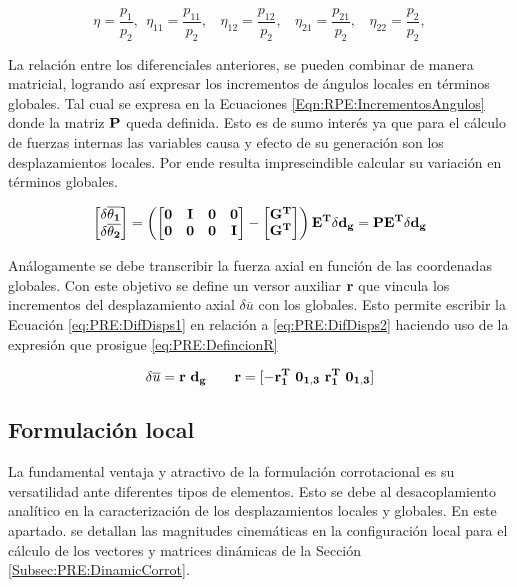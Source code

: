 \begin{equation}\label{Eqn:RPE:VectoresP}
	\eta = \frac{p_1}{p_2}, ~~\eta_{11} = \frac{p_{11}}{p_2}, ~~~~\eta_{12} = \frac{p_{12}}{p_2}, ~~~~\eta_{21} = \frac{p_{21}}{p_2}, ~~~~\eta_{22} = \frac{p_{2}}{p_2}, 
\end{equation}


La relación entre los diferenciales anteriores, se pueden combinar de manera matricial, logrando así expresar los incrementos de ángulos locales en términos globales. Tal cual se expresa en la Ecuaciones \eqref{Eqn:RPE:IncrementosAngulos} donde la matriz $\bf{P}$ queda definida. Esto es de sumo interés ya que para el cálculo de fuerzas internas las variables causa y efecto de su generación son los desplazamientos locales. Por ende resulta imprescindible calcular su variación en términos globales. 


\begin{equation}\label{Eqn:RPE:IncrementosAngulos}
	\begin{bmatrix}
		\bf{\delta\overline{\theta_1}}\\ 
		\bf{\delta\overline{\theta_2}}
	\end{bmatrix}=\left ( \begin{bmatrix}
		\bf{0} &\bf{I}  & \bf{0} &\bf{0} \\ 
		\bf{0}&\bf{0}  &\bf{0}  & \bf{I}
	\end{bmatrix}-\begin{bmatrix}
		\bf{G}^T\\ 
		\bf{G}^T
	\end{bmatrix} \right )\bf{E}^T \delta \bf{d_g}=\bf{P}\bf{E}^T \delta \bf{d_g}
\end{equation}

Análogamente se debe transcribir la fuerza axial en función de las coordenadas globales. Con este objetivo se define un versor auxiliar  $ \bf{r}$ que vincula los incrementos del desplazamiento axial $\delta \overline{u}$ con los globales. Esto permite escribir la Ecuación \eqref{eq:PRE:DifDisps1} en relación a  \eqref{eq:PRE:DifDisps2} haciendo uso de la expresión que prosigue \eqref{eq:PRE:DefincionR}

\begin{equation}\label{eq:PRE:DefincionR}
\delta \overline{u} = \bf{r}~ d_g ~~~~~~\bf{r} = [ -\bf{r}_1^T~ \bf{0}_{1,3}~ \bf{r}_1^T~ \bf{0}_{1,3}  ]
\end{equation}

\subsection{Formulación local}\label{Sec:PRE:LocalFormul}
La fundamental ventaja y atractivo de la formulación corrotacional es su versatilidad ante diferentes tipos de elementos. Esto se debe al desacoplamiento analítico en la caracterización de los desplazamientos locales y globales. En este apartado. se detallan las magnitudes cinemáticas en la configuración local para el cálculo de los vectores y matrices dinámicas de la Sección \ref{Subsec:PRE:DinamicCorrot}. 


